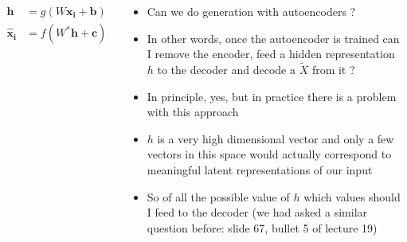 \begin{frame}
	\begin{columns}
		\begin{overlayarea}{\textwidth}{\textheight}
			\vspace{3pt}
			
			\vspace{-20pt}
			\begin{align*}
				\mathbf{h} &= g(W\mathbf{x_i} +\mathbf{b})\\
				\mathbf{\hat{x}_i} &= f(W^*\mathbf{h} +\mathbf{c})      
			\end{align*}
		\end{overlayarea}
		\begin{overlayarea}{\textwidth}{\textheight}
			\begin{itemize}[<+->]\justifying
				\item Can we do generation with autoencoders ?
				\item In other words, once the autoencoder is trained can I remove the encoder, feed a hidden representation $h$ to the decoder and decode a $\tilde{X}$ from it ?
				\item In principle, yes, but in practice there is a problem with this approach
				\item $h$ is a very high dimensional vector and only a few vectors in this space would actually correspond to meaningful latent representations of our input
				\item So of all the possible value of $h$ which values should I feed to the decoder (we had asked a similar question before: slide 67, bullet 5 of lecture 19)
			\end{itemize}
		\end{overlayarea}
	\end{columns}
\end{frame}


